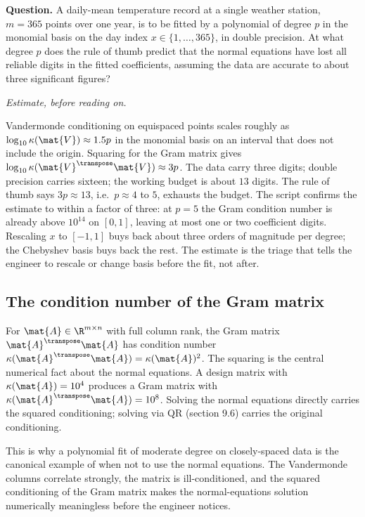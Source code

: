 \begin{estimation}
\textbf{Question.} A daily-mean temperature record at a single
weather station, $m = 365$ points over one year, is to be fitted by
a polynomial of degree $p$ in the monomial basis on the day index
$x \in \{1, \ldots, 365\}$, in double precision. At what degree $p$
does the rule of thumb predict that the normal equations have lost
all reliable digits in the fitted coefficients, assuming the data
are accurate to about three significant figures?

\smallskip
\textit{Estimate, before reading on.}

\smallskip
Vandermonde conditioning on equispaced points scales roughly as
$\log_{10}\kappa(\mat{V}) \approx 1.5 p$ in the monomial basis on
an interval that does not include the origin. Squaring for the Gram
matrix gives $\log_{10}\kappa(\mat{V}^{\transpose}\mat{V}) \approx
3 p$. The data carry three digits; double precision carries sixteen;
the working budget is about $13$ digits. The rule of thumb says
$3p \approx 13$, i.e.\ $p \approx 4$ to $5$, exhausts the budget.
The script  confirms the
estimate to within a factor of three: at $p = 5$ the Gram condition
number is already above $10^{14}$ on $[0, 1]$, leaving at most one
or two coefficient digits. Rescaling $x$ to $[-1, 1]$ buys back
about three orders of magnitude per degree; the Chebyshev basis
buys back the rest. The estimate is the triage that tells the
engineer to rescale or change basis before the fit, not after.
\end{estimation}

\subsection{The condition number of the Gram matrix}

For $\mat{A} \in \R^{m \times n}$ with full column rank, the Gram
matrix $\mat{A}^{\transpose}\mat{A}$ has condition number
$\kappa(\mat{A}^{\transpose}\mat{A}) = \kappa(\mat{A})^{2}$. The
squaring is the central numerical fact about the normal equations.
A design matrix with $\kappa(\mat{A}) = 10^{4}$ produces a Gram
matrix with $\kappa(\mat{A}^{\transpose}\mat{A}) = 10^{8}$. Solving
the normal equations directly carries the squared conditioning;
solving via QR (section 9.6) carries the original conditioning.

This is why a polynomial fit of moderate degree on closely-spaced
data is the canonical example of when not to use the normal
equations. The Vandermonde columns correlate strongly, the matrix
is ill-conditioned, and the squared conditioning of the Gram matrix
makes the normal-equations solution numerically meaningless before
the engineer notices.

